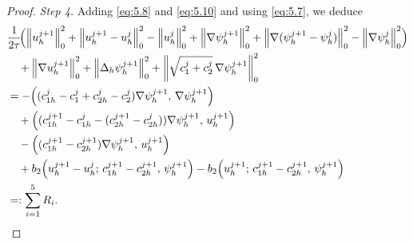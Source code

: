 \documentclass[a4paper,fleqn]{cas-sc}
\numberwithin{equation}{section}
\theoremstyle{definition}
\begin{document}
\begin{proof}
\textit{Step 4.}
Adding \eqref{eq:5.8} and \eqref{eq:5.10} and using \eqref{eq:5.7}, we deduce
\begin{align}
  &\frac{1}{2\tau}\!\Bigl(
    \left\|u_{h}^{j+1}\right\|_{0}^{2}
    + \left\|u_{h}^{j+1} - u_{h}^{j}\right\|_{0}^{2}
    - \left\|u_{h}^{j}\right\|_{0}^{2}
    + \left\|\nabla\psi_{h}^{j+1}\right\|_{0}^{2}
    + \left\|\nabla(\psi_{h}^{j+1} - \psi_{h}^{j})\right\|_{0}^{2}
    - \left\|\nabla\psi_{h}^{j}\right\|_{0}^{2}
  \Bigr)
  \nonumber\\
  &\quad
  + \left\|\nabla u_{h}^{j+1}\right\|_{0}^{2}
  + \left\|\Delta_{h}\psi_{h}^{j+1}\right\|_{0}^{2}
  + \left\|\sqrt{c_{1}^{j} + c_{2}^{j}}\,\nabla\psi_{h}^{j+1}\right\|_{0}^{2}
  \nonumber\\
  &= -\!\left((c_{1h}^{j} - c_{1}^{j} + c_{2h}^{j} - c_{2}^{j})\nabla\psi_{h}^{j+1},\,
              \nabla\psi_{h}^{j+1}\right)
  \nonumber\\
  &\quad
  + \left((c_{1h}^{j+1} - c_{1h}^{j} - (c_{2h}^{j+1} - c_{2h}^{j}))\nabla\psi_{h}^{j+1},\,
         u_{h}^{j+1}\right)
  \nonumber\\
  &\quad
  - \left((c_{1h}^{j+1} - c_{2h}^{j+1})\nabla\psi_{h}^{j+1},\, u_{h}^{j+1}\right)
  \nonumber\\
  &\quad
  + b_{2}\!\left(u_{h}^{j+1} - u_{h}^{j};\, c_{1h}^{j+1} - c_{2h}^{j+1},\, \psi_{h}^{j+1}\right)
  - b_{2}\!\left(u_{h}^{j+1};\, c_{1h}^{j+1} - c_{2h}^{j+1},\, \psi_{h}^{j+1}\right)
  \nonumber\\
  &=: \sum_{i=1}^{5} R_{i}.
  \label{eq:5.11}
\end{align}


\end{proof}
\end{document}
